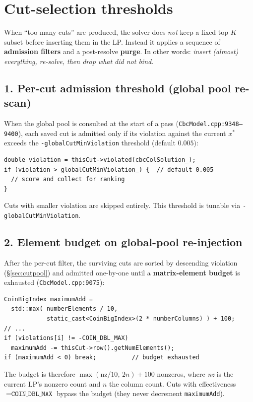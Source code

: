 \documentclass[11pt,a4paper]{article}
\begin{document}
\section{Cut-selection thresholds}
\label{sec:thresholds}

When ``too many cuts'' are produced, the solver does \emph{not} keep
a fixed top-$K$ subset before inserting them in the LP.  Instead it
applies a sequence of \textbf{admission filters} and a post-resolve
\textbf{purge}.  In other words: \emph{insert (almost) everything,
re-solve, then drop what did not bind}.

\subsection*{1. Per-cut admission threshold (global pool re-scan)}

When the global pool is consulted at the start of a pass
(\texttt{CbcModel.cpp:9348--9400}), each saved cut is admitted only
if its violation against the current $x^\ast$ exceeds the
\texttt{-globalCutMinViolation} threshold (default $0.005$):

\begin{lstlisting}
double violation = thisCut->violated(cbcColSolution_);
if (violation > globalCutMinViolation_) {  // default 0.005
  // score and collect for ranking
}
\end{lstlisting}

Cuts with smaller violation are skipped entirely.  This threshold is
tunable via \texttt{-globalCutMinViolation}.

\subsection*{2. Element budget on global-pool re-injection}
\label{sec:globalpool-budget}

After the per-cut filter, the surviving cuts are sorted by
descending violation (\S\ref{sec:cutpool}) and admitted one-by-one
until a \textbf{matrix-element budget} is exhausted
(\texttt{CbcModel.cpp:9075}):

\begin{lstlisting}
CoinBigIndex maximumAdd =
  std::max( numberElements / 10,
            static_cast<CoinBigIndex>(2 * numberColumns) ) + 100;
// ...
if (violations[i] != -COIN_DBL_MAX)
  maximumAdd -= thisCut->row().getNumElements();
if (maximumAdd < 0) break;          // budget exhausted
\end{lstlisting}

The budget is therefore $\max(\text{nz}/10,\,2n) + 100$ nonzeros,
where \emph{nz} is the current LP's nonzero count and $n$ the column
count.  Cuts with effectiveness $=\texttt{COIN\_DBL\_MAX}$ bypass
the budget (they never decrement \texttt{maximumAdd}).
\end{document}
